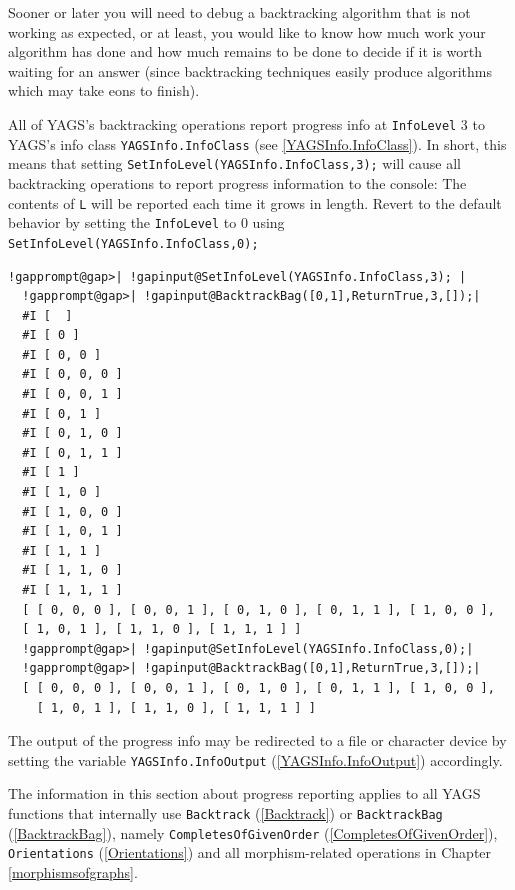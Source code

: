 \documentclass[a4paper,11pt]{report}
\begin{document}
{{Sooner or later you will need to debug a backtracking algorithm that is not
working as expected, or at least, you would like to know how much work your
algorithm has done and how much remains to be done to decide if it is worth
waiting for an answer (since backtracking techniques easily produce algorithms
which may take eons to finish). 

All of \textsf{YAGS}'s backtracking operations report progress info at \texttt{InfoLevel} 3 to \textsf{YAGS}'s info class \texttt{YAGSInfo.InfoClass} (see \ref{YAGSInfo.InfoClass}). In short, this means that setting \texttt{SetInfoLevel(YAGSInfo.InfoClass,3);} will cause all backtracking operations to report progress information to the
console: The contents of \texttt{L} will be reported each time it grows in length. Revert to the default behavior
by setting the \texttt{InfoLevel} to 0 using \texttt{SetInfoLevel(YAGSInfo.InfoClass,0);} 

 
\begin{Verbatim}[commandchars=!@|,fontsize=\small,frame=single,label=Example]
  !gapprompt@gap>| !gapinput@SetInfoLevel(YAGSInfo.InfoClass,3); |
  !gapprompt@gap>| !gapinput@BacktrackBag([0,1],ReturnTrue,3,[]);|
  #I [  ]
  #I [ 0 ]
  #I [ 0, 0 ]
  #I [ 0, 0, 0 ]
  #I [ 0, 0, 1 ]
  #I [ 0, 1 ]
  #I [ 0, 1, 0 ]
  #I [ 0, 1, 1 ]
  #I [ 1 ]
  #I [ 1, 0 ]
  #I [ 1, 0, 0 ]
  #I [ 1, 0, 1 ]
  #I [ 1, 1 ]
  #I [ 1, 1, 0 ]
  #I [ 1, 1, 1 ]
  [ [ 0, 0, 0 ], [ 0, 0, 1 ], [ 0, 1, 0 ], [ 0, 1, 1 ], [ 1, 0, 0 ], 
  [ 1, 0, 1 ], [ 1, 1, 0 ], [ 1, 1, 1 ] ]
  !gapprompt@gap>| !gapinput@SetInfoLevel(YAGSInfo.InfoClass,0);|
  !gapprompt@gap>| !gapinput@BacktrackBag([0,1],ReturnTrue,3,[]);|
  [ [ 0, 0, 0 ], [ 0, 0, 1 ], [ 0, 1, 0 ], [ 0, 1, 1 ], [ 1, 0, 0 ], 
    [ 1, 0, 1 ], [ 1, 1, 0 ], [ 1, 1, 1 ] ]
\end{Verbatim}
 

The output of the progress info may be redirected to a file or character
device by setting the variable \texttt{YAGSInfo.InfoOutput} (\ref{YAGSInfo.InfoOutput}) accordingly. 

The information in this section about progress reporting applies to all \textsf{YAGS} functions that internally use \texttt{Backtrack} (\ref{Backtrack}) or \texttt{BacktrackBag} (\ref{BacktrackBag}), namely \texttt{CompletesOfGivenOrder} (\ref{CompletesOfGivenOrder}), \texttt{Orientations} (\ref{Orientations}) and all morphism-related operations in Chapter \ref{morphismsofgraphs}. }

 }

 
\end{document}
